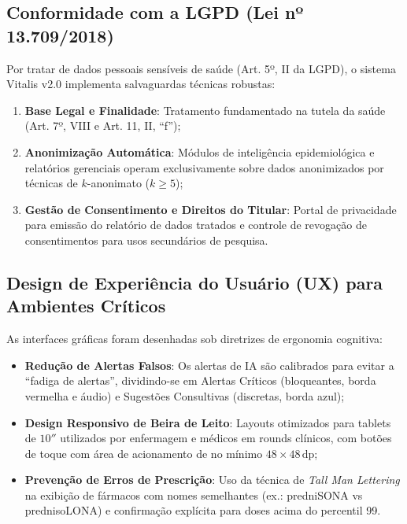 \documentclass[12pt,oneside,a4paper,article]{abntex2}
\begin{document}
\subsection{Conformidade com a LGPD (Lei nº 13.709/2018)}
Por tratar de dados pessoais sensíveis de saúde (Art. 5º, II da LGPD), o sistema Vitalis v2.0 implementa salvaguardas técnicas robustas:
\begin{enumerate}[noitemsep]
  \item \textbf{Base Legal e Finalidade}: Tratamento fundamentado na tutela da saúde (Art. 7º, VIII e Art. 11, II, ``f'');
  \item \textbf{Anonimização Automática}: Módulos de inteligência epidemiológica e relatórios gerenciais operam exclusivamente sobre dados anonimizados por técnicas de $k$-anonimato ($k \ge 5$);
  \item \textbf{Gestão de Consentimento e Direitos do Titular}: Portal de privacidade para emissão do relatório de dados tratados e controle de revogação de consentimentos para usos secundários de pesquisa.
\end{enumerate}
\subsection{Design de Experiência do Usuário (UX) para Ambientes Críticos}
As interfaces gráficas foram desenhadas sob diretrizes de ergonomia cognitiva:
\begin{itemize}[noitemsep]
  \item \textbf{Redução de Alertas Falsos}: Os alertas de IA são calibrados para evitar a ``fadiga de alertas'', dividindo-se em Alertas Críticos (bloqueantes, borda vermelha e áudio) e Sugestões Consultivas (discretas, borda azul);
  \item \textbf{Design Responsivo de Beira de Leito}: Layouts otimizados para tablets de $10''$ utilizados por enfermagem e médicos em rounds clínicos, com botões de toque com área de acionamento de no mínimo $48 \times 48\,\text{dp}$;
  \item \textbf{Prevenção de Erros de Prescrição}: Uso da técnica de \textit{Tall Man Lettering} na exibição de fármacos com nomes semelhantes (ex.: predniSONA vs prednisoLONA) e confirmação explícita para doses acima do percentil 99.
\end{itemize}
\end{document}
